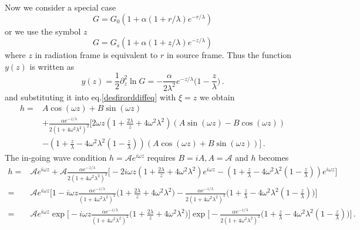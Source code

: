 \documentclass[
 jor,
 amsmath,amssymb,preprint,
]{revtex4-2}
\begin{document}
Now we consider a special case
\begin{equation}
G = G_0(1+\alpha(1+r/\lambda) e^{-r/\lambda})
\end{equation}
or we use the symbol $z$
\begin{equation}
G = G_s(1+\alpha(1+z/\lambda) e^{-z/\lambda})
\end{equation}
where $z$ in radiation frame is equivalent to $r$ in source frame. Thus the function $y(z)$ is written as
\begin{equation}
y(z) = \frac{1}{2} \partial_z^2 \ln G = -\frac{\alpha}{2\lambda^2}e^{-z/\lambda} \bigg(1 - \frac{z}{\lambda} \bigg) \,.
\end{equation}
and substituting it into eq.\eqref{desfirorddiffeq} with $\xi = z$ we obtain
\begin{equation}
\begin{aligned}
h = & A\cos(\omega z) + B \sin(\omega z) \\
& + \frac{\alpha e^{-z/\lambda}}{2(1+4\omega^2\lambda^2)^2} \bigg[ 2\omega z(1 + \frac{2\lambda}{z} + 4\omega^2\lambda^2)(A\sin(\omega z)-B\cos(\omega z)) \\
& - (1 + \frac{z}{\lambda} -4\omega^2\lambda^2(1 - \frac{z}{\lambda}))(A\cos(\omega z)+B\sin(\omega z))\bigg] \,.
\end{aligned}
\end{equation}
The in-going wave condition $h = \mathcal{A}e^{i\omega z}$ requires $B = iA, A = \mathcal{A}$ and $h$ becomes
\begin{equation}
\begin{aligned}
h = & \mathcal{A}e^{i\omega z} + \mathcal{A}\frac{\alpha e^{-z/\lambda}}{2(1+4\omega^2\lambda^2)^2} \bigg[ -2i\omega z(1 + \frac{2\lambda}{z} + 4\omega^2\lambda^2)e^{i\omega z} - (1 + \frac{z}{\lambda} -4\omega^2\lambda^2(1 - \frac{z}{\lambda}))e^{i\omega z}\bigg] \\
= & \mathcal{A}e^{i\omega z} \bigg[1 - i\omega z\frac{\alpha e^{-z/\lambda}}{(1+4\omega^2\lambda^2)^2} \bigg(1 + \frac{2\lambda}{z} + 4\omega^2\lambda^2\bigg) - \frac{\alpha e^{-z/\lambda}}{2(1+4\omega^2\lambda^2)^2} \bigg(1 + \frac{z}{\lambda} -4\omega^2\lambda^2(1 - \frac{z}{\lambda})\bigg)  \bigg] \\
= & \mathcal{A}e^{i\omega z} \exp\bigg[- i\omega z\frac{\alpha e^{-z/\lambda}}{(1+4\omega^2\lambda^2)^2} \bigg(1 + \frac{2\lambda}{z} + 4\omega^2\lambda^2\bigg) \bigg] \exp\bigg[- \frac{\alpha e^{-z/\lambda}}{2(1+4\omega^2\lambda^2)^2} \bigg(1 + \frac{z}{\lambda} -4\omega^2\lambda^2(1 - \frac{z}{\lambda})\bigg)\bigg] \,.
\end{aligned}
\end{equation}
\end{document}
